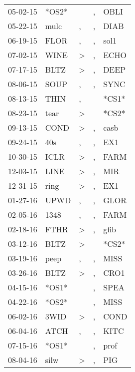 \begin{supertabular}{lllll}
 05-02-15 &  *OS2* &                  &             , &   OBLI \\
 05-22-15 &   mulc &                , &             , &   DIAB \\
 06-19-15 &   FLOR &                , &             , &   sol1 \\
 07-02-15 &   WINE &     \textgreater &             , &   ECHO \\
 07-17-15 &   BLTZ &     \textgreater &             , &   DEEP \\
 08-06-15 &   SOUP &                , &             , &   SYNC \\
 08-13-15 &   THIN &                , &               &  *CS1* \\
 08-23-15 &   tear &     \textgreater &               &  *CS2* \\
 09-13-15 &   COND &     \textgreater &             , &   casb \\
 09-24-15 &    40s &                , &             , &    EX1 \\
 10-30-15 &   ICLR &     \textgreater &             , &   FARM \\
 12-03-15 &   LINE &     \textgreater &             , &    MIR \\
 12-31-15 &   ring &     \textgreater &             , &    EX1 \\
 01-27-16 &   UPWD &                , &             , &   GLOR \\
 02-05-16 &   1348 &                , &             , &   FARM \\
 02-18-16 &   FTHR &     \textgreater &             , &   gfib \\
 03-12-16 &   BLTZ &     \textgreater &               &  *CS2* \\
 03-19-16 &   peep &                , &             , &   MISS \\
 03-26-16 &   BLTZ &     \textgreater &             , &   CRO1 \\
 04-15-16 &  *OS1* &                  &             , &   SPEA \\
 04-22-16 &  *OS2* &                  &             , &   MISS \\
 06-02-16 &   3WID &     \textgreater &             , &   COND \\
 06-04-16 &   ATCH &                , &             , &   KITC \\
 07-15-16 &  *OS1* &                  &             , &   prof \\
 08-04-16 &   silw &     \textgreater &             , &    PIG \\

\end{supertabular}
